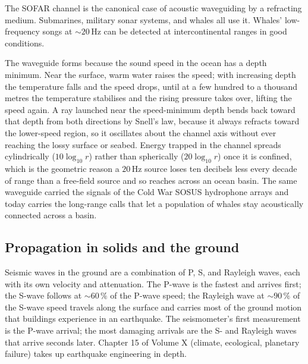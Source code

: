 The SOFAR channel is the canonical case of acoustic waveguiding by a
refracting medium. Submarines, military sonar systems, and whales
all use it. Whales' low-frequency songs at $\sim 20\,\si{\hertz}$
can be detected at intercontinental ranges in good conditions.

The waveguide forms because the sound speed in the ocean has a depth
minimum. Near the surface, warm water raises the speed; with increasing
depth the temperature falls and the speed drops, until at a few hundred
to a thousand metres the temperature stabilises and the rising pressure
takes over, lifting the speed again. A ray launched near the
speed-minimum depth bends back toward that depth from both directions by
Snell's law, because it always refracts toward the lower-speed region, so
it oscillates about the channel axis without ever reaching the lossy
surface or seabed. Energy trapped in the channel spreads cylindrically
($10\log_{10} r$) rather than spherically ($20\log_{10} r$) once it is
confined, which is the geometric reason a $20\,\si{\hertz}$ source loses
ten decibels less every decade of range than a free-field source and so
reaches across an ocean basin. The same waveguide carried the signals of
the Cold War SOSUS hydrophone arrays and today carries the long-range
calls that let a population of whales stay acoustically connected across
a basin.

\subsection{Propagation in solids and the ground}

Seismic waves in the ground are a combination of P, S, and Rayleigh
waves, each with its own velocity and attenuation. The P-wave is
the fastest and arrives first; the S-wave follows at $\sim 60\,\%$
of the P-wave speed; the Rayleigh wave at $\sim 90\,\%$ of the
S-wave speed travels along the surface and carries most of the
ground motion that buildings experience in an earthquake. The
seismometer's first measurement is the P-wave arrival; the most
damaging arrivals are the S- and Rayleigh waves that arrive seconds
later. Chapter 15 of Volume X (climate, ecological, planetary
failure) takes up earthquake engineering in depth.

